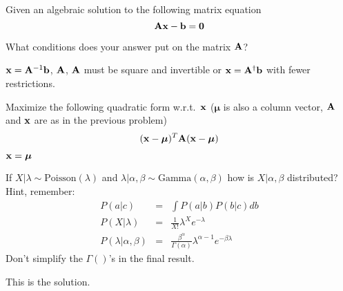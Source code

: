 \documentclass[12pt]{article}
\begin{document}
{
\abcs
\item
Given an algebraic solution to the following matrix equation
\[ {\bf A} {\bf x} - {\bf b} = {\bf 0}\]
\item
What conditions does your answer put on the matrix ${\bf A}$?
\endabcs
}
{
\vspace{3cm}
\vfill
  \answer
}
{
${\bf x} = {\bf A}^{-1}{\bf b}$, ${\bf A}$, ${\bf A}$ must be square and invertible or ${\bf x} = {\bf A}^\dagger{\bf b}$ with fewer restrictions.
}

{
\abcs
\item
Maximize the following quadratic form w.r.t.~${\bf x}$ ($ \boldsymbol{\mu}$ is also a column vector, ${\bf A}$ and $\bf x$ are as in the previous problem)
\[ ({\bf x - \boldsymbol{\mu}})^T{\bf A}( {\bf x -  \boldsymbol{\mu}} )\]
\endabcs
}
{
\vspace{3cm}
\vfill

  \answer
  \newpage
}
{
$\bf x = \boldsymbol{\mu}$
}

{
If $X | \lambda \sim \mathrm{Poisson}(\lambda)$ and $\lambda | \alpha, \beta \sim \mathrm{Gamma}(\alpha, \beta)$ how is $X|\alpha, \beta$ distributed?  Hint, remember:
\begin{eqnarray*}
P(a|c) &=& \int P(a|b) P(b|c) db \\
P(X|\lambda) &=& \frac{1}{X!}\lambda^X e^{-\lambda} \\
P(\lambda|\alpha, \beta) &=& \frac{\beta^\alpha}{\Gamma(\alpha)}\lambda^{\alpha-1} e^{-\beta\lambda} 
\end{eqnarray*}
Don't simplify the $\Gamma()$'s in the final result.
}
{
\vspace{3.5in}
\vfill
\newpage

}
{

This is the solution.  
}
\end{document}
